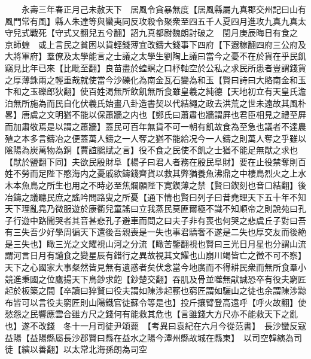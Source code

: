 　　永壽三年春正月己未赦天下　居風令貪暴無度【居風縣屬九真郡交州記曰山有風門常有風】縣人朱達等與蠻夷同反攻殺令聚衆至四五千人夏四月進攻九真九真太守兒式戰死【守式又翻兒五兮翻】詔九真都尉魏朗討破之　閏月庚辰晦日有食之　京師蝗　或上言民之貧困以貨輕錢薄宜改鑄大錢事下四府【下遐稼翻四府三公府及大將軍府】羣僚及太學能言之士議之太學生劉陶上議曰當今之憂不在於貨在乎民飢竊見比年已來【比毗至翻】良苗盡於蝗螟之口杼軸空於公私之求民所患者豈謂錢貨之厚薄銖兩之輕重哉就使當今沙礫化為南金瓦石變為和玉【賢曰詩曰大賂南金和玉卞和之玉礫郎狄翻】使百姓渇無所飲飢無所食雖皇羲之純德【天地初立有天皇氏澹泊無所施為而民自化伏羲氏始畫八卦造書契以代結繩之政去洪荒之世未遠故其風朴畧】唐虞之文明猶不能以保蕭牆之内也【鄭氏曰蕭肅也牆謂屛也君臣相見之禮至屛而加肅敬焉是以謂之蕭牆】蓋民可百年無貨不可一朝有飢故食為至急也議者不達農殖之本多言鑄冶之便蓋萬人鑄之一人奪之猶不能給况今一人鑄之則萬人奪之乎雖以隂陽為炭萬物為銅【賈誼鵩賦之言】役不食之民使不飢之士猶不能足無猒之求也【猒於鹽翻下同】夫欲民殷財阜【楊子曰君人者務在殷民阜財】要在止役禁奪則百姓不勞而足陛下愍海内之憂戚欲鑄錢齊貨以救其弊猶養魚沸鼎之中棲鳥烈火之上水木本魚鳥之所生也用之不時必至焦爛願陛下寛鍥薄之禁【賢曰鍥刻也音口結翻】後冶鑄之議聽民庶之謠吟問路叟之所憂【通下情也賢曰列子曰昔堯理天下五十年不知天下理亂堯乃微服遊於康衢兒童謠曰立我蒸民莫匪爾極不識不知順帝之則說苑曰孔子行遊中路聞哭者其音甚悲孔子避車而問之曰夫子非有喪也何哭之悲虞丘子對曰吾有三失吾少好學周徧天下還後吾親喪是一失也事君驕奢不遂是二失也厚交友而後絶是三失也】瞰三光之文耀視山河之分流【瞰苦鑒翻視也賢曰三光日月星也分謂山流謂河言日月有讁食之變星辰有錯行之異故視其文耀也山崩川竭皆亡之徵不可不察】天下之心國家大事粲然皆見無有遺惑者矣伏念當今地廣而不得耕民衆而無所食羣小競進秉國之位鷹揚天下鳥鈔求飽【鈔楚交翻】吞肌及骨並噬無猒誠恐卒有役夫窮匠起於板築之間【卒讀曰猝賢曰役夫謂如陳涉起蘄也窮匠謂如驪山之徒也余謂陳涉黥布皆可以言役夫窮匠則山陽鐵官徒蘇令等是也】投斤攘臂登高遠呼【呼火故翻】使愁怨之民響應雲合雖方尺之錢何有能救其危也【言雖錢大方尺亦不能救天下之亂也】遂不改錢　冬十一月司徒尹頌薨　【考異曰袁紀在六月今從范書】　長沙蠻反寇益陽【益陽縣屬長沙郡賢曰縣在益水之陽今潭州縣故城在縣東】　以司空韓縯為司徒【縯以善翻】以太常北海孫朗為司空


